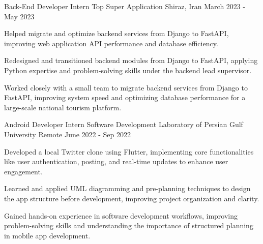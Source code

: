 

\begin{cventries}

  \cventry
    {Back-End Developer Intern} %
    {Top Super Application} %
    {Shiraz, Iran} %
    {March 2023 - May 2023} %
    {
      \begin{cvitems} %
        \item {Helped migrate and optimize backend services from Django to FastAPI, improving web application API performance and database efficiency.}
        \item {Redesigned and transitioned backend modules from Django to FastAPI, applying Python expertise and problem-solving skills under the backend lead supervisor.}
        \item {Worked closely with a small team to migrate backend services from Django to FastAPI, improving system speed and optimizing database performance for a large-scale national tourism platform.}
      \end{cvitems}
    }

    \cventry
    {Android Developer Intern} %
    {Software Development Laboratory of Persian Gulf University} %
    {Remote} %
    {June 2022 - Sep 2022} %
    {
      \begin{cvitems} %
        \item {Developed a local Twitter clone using Flutter, implementing core functionalities like user authentication, posting, and real-time updates to enhance user engagement.}
        \item {Learned and applied UML diagramming and pre-planning techniques to design the app structure before development, improving project organization and clarity.}
        \item {Gained hands-on experience in software development workflows, improving problem-solving skills and understanding the importance of structured planning in mobile app development.}
      \end{cvitems}
    }

\end{cventries}
